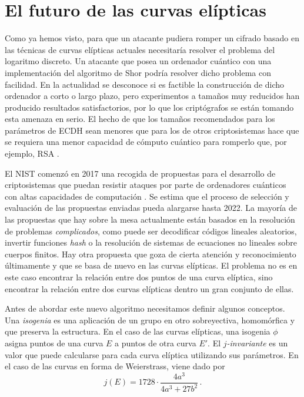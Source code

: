 \documentclass[
  a4paper,
  12pt,
  spanish,
]{scrartcl}
\begin{document}
\section{El futuro de las curvas elípticas}

Como ya hemos visto, para que un atacante pudiera romper un cifrado basado en las técnicas de curvas elípticas actuales necesitaría resolver el problema del logaritmo discreto.
Un atacante que posea un ordenador cuántico con una implementación del algoritmo de Shor \parencite{shor_polynomial-time_1999} podría resolver dicho problema con facilidad. 
En la actualidad se desconoce si es factible la construcción de dicho ordenador a corto o largo plazo, pero experimentos a tamaños muy reducidos han producido resultados satisfactorios, por lo que los criptógrafos se están tomando esta amenaza en serio.
El hecho de que los tamaños recomendados para los parámetros de ECDH sean menores que para los de otros criptosistemas hace que se requiera una menor capacidad de cómputo cuántico para romperlo que, por ejemplo, RSA \parencite{beauregard_circuit_2003} \parencite{proos_shors_2004}.

El NIST comenzó en 2017 una recogida de propuestas para el desarrollo de criptosistemas que puedan resistir ataques por parte de ordenadores cuánticos con altas capacidades de computación \parencite{computer_security_division_call_2017}.
Se estima que el proceso de selección y evaluación de las propuestas enviadas pueda alargarse hasta 2022.
La mayoría de las propuestas que hay sobre la mesa actualmente están basados en la resolución de problemas \textit{complicados}, como puede ser decodificar códigos lineales aleatorios, invertir funciones \textit{hash} o la resolución de sistemas de ecuaciones no lineales sobre cuerpos finitos.
Hay otra propuesta que goza de cierta atención y reconocimiento últimamente y que se basa de nuevo en las curvas elípticas.
El problema no es en este caso encontrar la relación entre dos puntos de una curva elíptica, sino encontrar la relación entre dos curvas elípticas dentro un gran conjunto de ellas.

Antes de abordar este nuevo algoritmo necesitamos definir algunos conceptos.
Una \textit{isogenia} es una aplicación de un grupo en otro sobreyectiva, homomórfica y que preserva la estructura.
En el caso de las curvas elípticas, una isogenia \(\phi\) asigna puntos de una curva \(E\) a puntos de otra curva \(E'\).
El \(j\)\textit{-invariante} es un valor que puede calcularse para cada curva elíptica utilizando sus parámetros. En el caso de las curvas en forma de Weierstrass, viene dado por \[
  j(E) = 1728 \cdot \frac{4a^3}{4a^3 + 27b^2}\,.
\]
\end{document}
